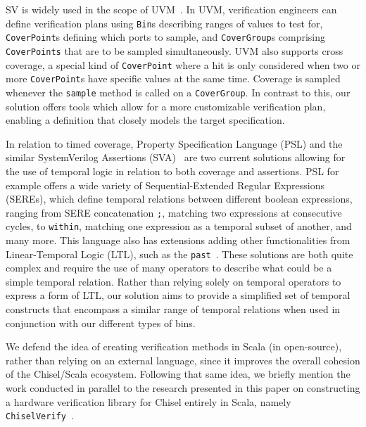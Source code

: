 \documentclass[conference]{IEEEtran}
\begin{document}
SV is widely used in the scope of UVM~\cite{uvm2015}. 
In UVM, verification engineers can define verification plans using \texttt{Bin}s describing ranges of values to test for, \texttt{CoverPoint}s defining which ports to sample, and \texttt{CoverGroup}s comprising \texttt{CoverPoints} that are to be sampled simultaneously. 
UVM also supports cross coverage, a special kind of \texttt{CoverPoint} where a hit is only considered when two or more \texttt{CoverPoint}s have specific values at the same time.
Coverage is sampled whenever the \texttt{sample} method is called on a \texttt{CoverGroup}. 
In contrast to this, our solution offers tools which allow for a more customizable verification plan, enabling a definition that closely models the target specification.

In relation to timed coverage, Property Specification Language (PSL) and the similar SystemVerilog Assertions (SVA)~\cite{Boule2008} are two current solutions allowing for the use of temporal logic in relation to both coverage and assertions. 
PSL for example offers a wide variety of Sequential-Extended Regular Expressions (SEREs), which define temporal relations between different boolean expressions, ranging from SERE concatenation \texttt{;}, matching two expressions at consecutive cycles, to \texttt{within}, matching one expression as a temporal subset of another, and many more. This language also has extensions adding other functionalities from Linear-Temporal Logic (LTL), such as the \texttt{past}~\cite{Dax2010:temporal-logics}. These solutions are both quite complex and require the use of many operators to describe what could be a simple temporal relation. Rather than relying solely on temporal operators to express a form of LTL, our solution aims to provide a simplified set of temporal constructs that encompass a similar range of temporal relations when used in conjunction with our different types of bins. %

We defend the idea of creating verification methods in Scala (in open-source), rather than relying on an external language, since it improves the overall cohesion of the Chisel/Scala ecosystem. 
Following that same idea, we briefly mention the work conducted in parallel to the research presented in this paper on constructing a hardware verification library for Chisel entirely in Scala, namely \texttt{ChiselVerify}~\cite{ChiselVerify:dobis2021}.
\end{document}
